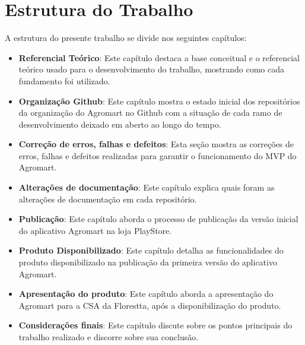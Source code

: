 \section{Estrutura do Trabalho}
A estrutura do presente trabalho se divide nos seguintes capítulos:

\begin{itemize}
    \item \textbf{Referencial Teórico}: Este capítulo destaca a base conceitual e o referencial teórico usado para o desenvolvimento do trabalho, mostrando como cada fundamento foi utilizado.
    \item \textbf{Organização Github}: Este capítulo mostra o estado inicial dos repositórios da organização do Agromart no Github com a situação de cada ramo de desenvolvimento deixado em aberto ao longo do tempo.
    \item \textbf{Correção de erros, falhas e defeitos}: Esta seção mostra as correções de erros, falhas e defeitos realizadas para garantir o funcionamento do MVP do Agromart.
    \item \textbf{Alterações de documentação}: Este capítulo explica quais foram as alterações de documentação em cada repositório.
    \item \textbf{Publicação}: Este capítulo aborda o processo de publicação da versão inicial do aplicativo Agromart na loja PlayStore.
    \item \textbf{Produto Disponibilizado}: Este capítulo detalha as funcionalidades do produto disponibilizado na publicação da primeira versão do aplicativo Agromart.
    \item \textbf{Apresentação do produto}: Este capítulo aborda a apresentação do Agromart para a CSA da Florestta, após a disponibilização do produto.
    \item \textbf{Considerações finais}: Este capítulo discute sobre os pontos principais do trabalho realizado e discorre sobre sua conclusão.
\end{itemize}